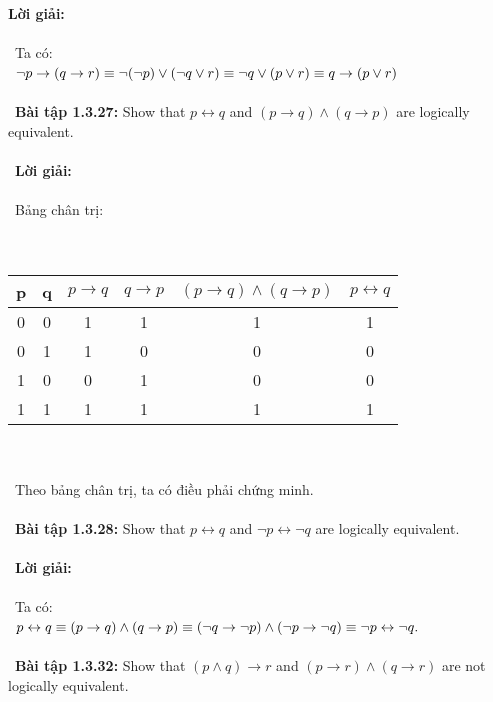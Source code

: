 \documentclass[a4paper]{article}
\begin{document}
\textbf{Lời giải: } \\\ \\\
Ta có: \\\
$\lnot p \rightarrow (q \rightarrow r) \\\equiv \lnot (\lnot p) \lor (\lnot q \lor r) \\\equiv \lnot q \lor (p \lor r) \\\equiv q \rightarrow (p \lor r)$ \\\ \\\
\textbf{Bài tập 1.3.27: }Show that $p \leftrightarrow q$ and $(p \rightarrow q) \land (q \rightarrow p)$ are logically equivalent. \\\ \\\
\textbf{Lời giải: }\\\ \\\
Bảng chân trị: \\\ \\\
\begin{tabular}{|c|c|c|c|c|c|}
\hline 
p & q & $p \rightarrow q$ & $q \rightarrow p$ & $(p \rightarrow q) \land (q \rightarrow p)$ & $p \leftrightarrow q$ \\ 
\hline 
0 & 0 & 1 & 1 & 1 & 1 \\ 
\hline 
0 & 1 & 1 & 0 & 0 & 0 \\ 
\hline 
1 & 0 & 0 & 1 & 0 & 0 \\ 
\hline 
1 & 1 & 1 & 1 & 1 & 1 \\ 
\hline 
\end{tabular} \\\ \\\
Theo bảng chân trị, ta có điều phải chứng minh. \\\ \\\
\textbf{Bài tập 1.3.28: }Show that $p \leftrightarrow q$ and $\lnot p \leftrightarrow \lnot q$ are logically equivalent. \\\ \\\
\textbf{Lời giải: } \\\ \\\
Ta có: \\\ 
$p \leftrightarrow q \\\equiv (p \rightarrow q) \land (q \rightarrow p) \\\equiv (\lnot q \rightarrow \lnot p) \land (\lnot p \rightarrow \lnot q) \\\equiv \lnot p \leftrightarrow \lnot q.$ \\\ \\\
\textbf{Bài tập 1.3.32: }Show that $(p \land q) \rightarrow r$ and $(p \rightarrow r) \land (q \rightarrow r)$ are not logically equivalent. \\\ \\\
\end{document}

